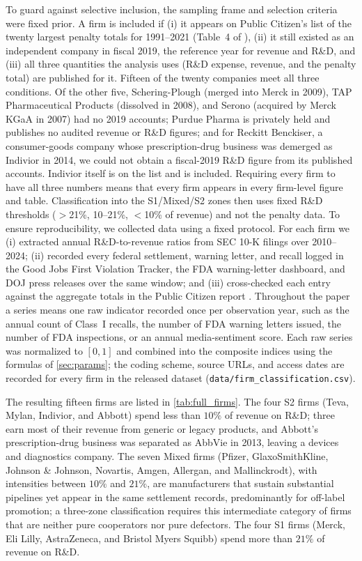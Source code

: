 \documentclass[10pt]{article}
\begin{document}
To guard against selective inclusion, the sampling frame and selection criteria were fixed prior. A firm is included if (i) it appears on Public Citizen's list of the twenty largest penalty totals for 1991--2021 (Table~4 of \cite{publiccitizen2024}), (ii) it still existed as an independent company in fiscal 2019, the reference year for revenue and R\&D, and (iii) all three quantities the analysis uses (R\&D expense, revenue, and the penalty total) are published for it. Fifteen of the twenty companies meet all three conditions. Of the other five, Schering-Plough (merged into Merck in 2009), TAP Pharmaceutical Products (dissolved in 2008), and Serono (acquired by Merck KGaA in 2007) had no 2019 accounts; Purdue Pharma is privately held and publishes no audited revenue or R\&D figures; and for Reckitt Benckiser, a consumer-goods company whose prescription-drug business was demerged as Indivior in 2014, we could not obtain a fiscal-2019 R\&D figure from its published accounts. Indivior itself is on the list and is included. Requiring every firm to have all three numbers means that every firm appears in every firm-level figure and table. Classification into the S1/Mixed/S2 zones then uses fixed R\&D thresholds ($>$21\%, 10--21\%, $<$10\% of revenue) and not the penalty data. To ensure reproducibility, we collected data using a fixed protocol. For each firm we (i) extracted annual R\&D-to-revenue ratios from SEC 10-K filings over 2010--2024; (ii) recorded every federal settlement, warning letter, and recall logged in the Good Jobs First Violation Tracker, the FDA warning-letter dashboard, and DOJ press releases over the same window; and (iii) cross-checked each entry against the aggregate totals in the Public Citizen report \cite{publiccitizen2024}. Throughout the paper a series means one raw indicator recorded once per observation year, such as the annual count of Class~I recalls, the number of FDA warning letters issued, the number of FDA inspections, or an annual media-sentiment score. Each raw series was normalized to $[0,1]$ and combined into the composite indices using the formulas of \cref{sec:params}; the coding scheme, source URLs, and access dates are recorded for every firm in the released dataset (\texttt{data/firm\_classification.csv}).

The resulting fifteen firms are listed in \cref{tab:full_firms}. The four S2 firms (Teva, Mylan, Indivior, and Abbott) spend less than $10\%$ of revenue on R\&D; three earn most of their revenue from generic or legacy products, and Abbott's prescription-drug business was separated as AbbVie in 2013, leaving a devices and diagnostics company. The seven Mixed firms (Pfizer, GlaxoSmithKline, Johnson \& Johnson, Novartis, Amgen, Allergan, and Mallinckrodt), with intensities between $10\%$ and $21\%$, are manufacturers that sustain substantial pipelines yet appear in the same settlement records, predominantly for off-label promotion; a three-zone classification requires this intermediate category of firms that are neither pure cooperators nor pure defectors. The four S1 firms (Merck, Eli Lilly, AstraZeneca, and Bristol Myers Squibb) spend more than $21\%$ of revenue on R\&D.
\end{document}
